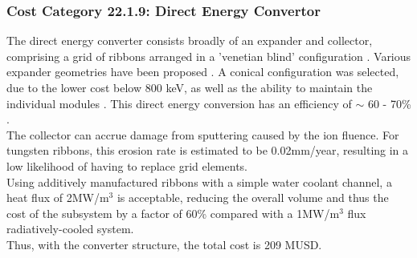 \subsubsection*{Cost Category 22.1.9: Direct Energy Convertor}

The direct energy converter consists broadly of an expander and collector, comprising a grid of ribbons arranged in a 'venetian blind' configuration \cite{post1970mirror}. Various expander geometries have been proposed \cite{post1970mirror}. A conical configuration was selected, due to the lower cost below 800 keV, as well as the ability to maintain the individual modules \cite{barr1974preliminary}. This direct energy conversion has an efficiency of $\sim$ 60 - 70\% \cite{moir1973venetian}.\\

The collector can accrue damage from sputtering caused by the ion fluence. For tungsten ribbons, this erosion rate is estimated to be 0.02mm/year, resulting in a low likelihood of having to replace grid elements.\\

Using additively manufactured ribbons with a simple water coolant channel, a heat flux of 2MW/m$^3$ is acceptable, reducing the overall volume and thus the cost of the subsystem by a factor of 60\% compared with a 1MW/m$^3$ flux radiatively-cooled system.\\

 Thus, with the converter structure, the total cost is 209 MUSD.


\begin{table}[h]
    \centering
    \caption{Cost Table}
    \label{tab:cost-table}
\end{table}
